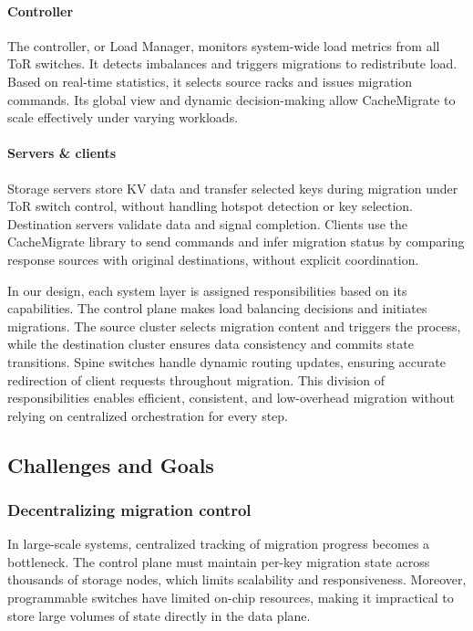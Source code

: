 \documentclass[conference]{IEEEtran}
\begin{document}
\paragraph{Controller}
The controller, or Load Manager, monitors system-wide load metrics from all ToR switches. It detects imbalances and triggers migrations to redistribute load. Based on real-time statistics, it selects source racks and issues migration commands. Its global view and dynamic decision-making allow CacheMigrate to scale effectively under varying workloads.

\paragraph{Servers \& clients}
Storage servers store KV data and transfer selected keys during migration under ToR switch control, without handling hotspot detection or key selection. Destination servers validate data and signal completion. Clients use the CacheMigrate library to send commands and infer migration status by comparing response sources with original destinations, without explicit coordination.

In our design, each system layer is assigned responsibilities based on its capabilities. The control plane makes load balancing decisions and initiates migrations. The source cluster selects migration content and triggers the process, while the destination cluster ensures data consistency and commits state transitions. Spine switches handle dynamic routing updates, ensuring accurate redirection of client requests throughout migration. This division of responsibilities enables efficient, consistent, and low-overhead migration without relying on centralized orchestration for every step.

\subsection{Challenges and Goals}

\subsubsection{Decentralizing migration control}
In large-scale systems, centralized tracking of migration progress becomes a bottleneck. The control plane must maintain per-key migration state across thousands of storage nodes, which limits scalability and responsiveness. Moreover, programmable switches have limited on-chip resources, making it impractical to store large volumes of state directly in the data plane.
\end{document}
